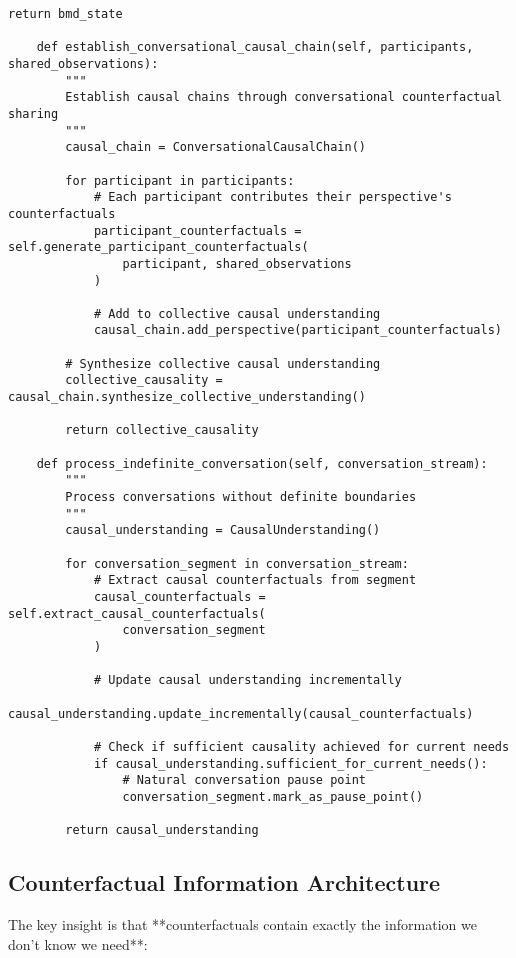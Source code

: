 \documentclass[11pt,a4paper]{article}
\begin{document}
\begin{lstlisting}[style=pythonstyle, caption=Complete Reverse BMD Inference System]
        return bmd_state
    
    def establish_conversational_causal_chain(self, participants, shared_observations):
        """
        Establish causal chains through conversational counterfactual sharing
        """
        causal_chain = ConversationalCausalChain()
        
        for participant in participants:
            # Each participant contributes their perspective's counterfactuals
            participant_counterfactuals = self.generate_participant_counterfactuals(
                participant, shared_observations
            )
            
            # Add to collective causal understanding
            causal_chain.add_perspective(participant_counterfactuals)
        
        # Synthesize collective causal understanding
        collective_causality = causal_chain.synthesize_collective_understanding()
        
        return collective_causality
    
    def process_indefinite_conversation(self, conversation_stream):
        """
        Process conversations without definite boundaries
        """
        causal_understanding = CausalUnderstanding()
        
        for conversation_segment in conversation_stream:
            # Extract causal counterfactuals from segment
            causal_counterfactuals = self.extract_causal_counterfactuals(
                conversation_segment
            )
            
            # Update causal understanding incrementally
            causal_understanding.update_incrementally(causal_counterfactuals)
            
            # Check if sufficient causality achieved for current needs
            if causal_understanding.sufficient_for_current_needs():
                # Natural conversation pause point
                conversation_segment.mark_as_pause_point()
            
        return causal_understanding
\end{lstlisting}

\subsection{Counterfactual Information Architecture}

The key insight is that **counterfactuals contain exactly the information we don't know we need**:
\end{document}
